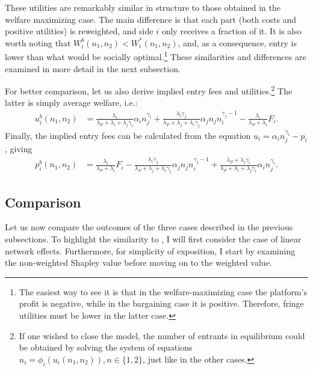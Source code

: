 \documentclass[a4paper]{article}
\begin{document}
These utilities are remarkably similar in structure to those obtained in the welfare maximizing case.
The main difference is that each part (both costs and positive utilities) is reweighted, and side $i$ only receives a fraction of it.
It is also worth noting that $W_i^b(n_1, n_2) < W_i^*(n_1, n_2)$, and, as a consequence, entry is lower than what would be socially optimal.\footnote{
    The easiest way to see it is that in the welfare-maximizing case the platform's profit is negative, while in the bargaining case it is positive.
    Therefore, fringe utilities must be lower in the latter case.
}
These similarities and differences are examined in more detail in the next subsection.

For better comparison, let us also derive implied entry fees and utilities.\footnote{
    If one wished to close the model, the number of entrants in equilibrium could be obtained by solving the system of equations $n_i = \phi_i(u_i(n_1, n_2)), n \in \{1, 2\}$, just like in the other cases.
}
The latter is simply average welfare, i.e.:
\begin{align*}
    u_i^b(n_1, n_2) &= \frac{\lambda_i}{\lambda_P + \lambda_i + \lambda_j\gamma_i} \alpha_i n_j^{\gamma_i} + \frac{\lambda_i \gamma_j}{\lambda_P + \lambda_j + \lambda_i\gamma_j} \alpha_j n_j n_i^{\gamma_j - 1} - \frac{\lambda_i}{\lambda_P + \lambda_i} F_i.
\end{align*}
Finally, the implied entry fees can be calculated from the equation $u_i = \alpha_i n_j^{\gamma_i} - p_i$, giving
\begin{align*}
    p_i^b(n_1, n_2) &= \frac{\lambda_i}{\lambda_P + \lambda_i} F_i - \frac{\lambda_i \gamma_j}{\lambda_P + \lambda_j + \lambda_i\gamma_j} \alpha_j n_j n_i^{\gamma_j - 1} + \frac{\lambda_P + \lambda_j\gamma_i}{\lambda_P + \lambda_i + \lambda_j\gamma_i} \alpha_i n_j^{\gamma_i}.
\end{align*}

\subsection{Comparison}

Let us now compare the outcomes of the three cases described in the previous subsections.
To highlight the similarity to \textcite{armstrong2006competition}, I will first consider the case of linear network effects.
Furthermore, for simplicity of exposition, I start by examining the non-weighted Shapley value before moving on to the weighted value.
\end{document}
